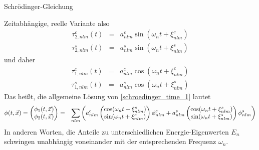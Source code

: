 \begin{chapter}{\titlestr}
\begin{section}{Schrödinger-Gleichung}
\begin{subsection}{Zeitabhängige, reelle Variante}
also
\begin{eqnarray*}
\tau^c_{2,nlm}(t)&=&a^c_{nlm}\sin(\omega_n t+\xi^c_{nlm})\\
\tau^s_{2,nlm}(t)&=&a^s_{nlm}\sin(\omega_n t+\xi^s_{nlm})
\end{eqnarray*}
und daher
\begin{eqnarray*}
\tau^c_{1,nlm}(t)&=&a^c_{nlm}\cos(\omega_n t+\xi^c_{nlm})\\
\tau^s_{1,nlm}(t)&=&a^s_{nlm}\cos(\omega_n t+\xi^s_{nlm})
\end{eqnarray*}
Das heißt, die allgemeine Lösung von \ref{schroedinger_time_1} lautet
\begin{eqnarray*}
\phi(t, \vec{x})=\begin{pmatrix}\phi_1(t, \vec{x})\\ \phi_2(t, \vec{x})\end{pmatrix} &=& \sum_{nlm} \left(a^c_{nlm}\begin{pmatrix}\cos(\omega_n t+\xi^c_{nlm})\\\sin(\omega_n t+\xi^c_{nlm})\end{pmatrix}\phi^c_{nlm}
+a^s_{nlm}\begin{pmatrix}\cos(\omega_n t+\xi^s_{nlm})\\\sin(\omega_n t+\xi^s_{nlm})\end{pmatrix}\phi^s_{nlm}\right)
\end{eqnarray*}
In anderen Worten, die Anteile zu unterschiedlichen Energie-Eigenwerten $E_n$ schwingen unabhängig voneinander mit der entsprechenden Frequenz $\omega_n$.
\end{subsection}


\end{section}
\end{chapter}
